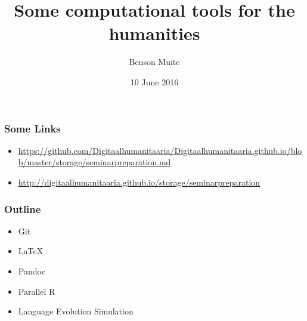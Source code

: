 \documentclass{beamer}
\title[]
{Some computational tools for the humanities}
\author[]{Benson Muite}
\institute[]{\url{benson.muite@ut.ee}\\
                  \url{http://kodu.ut.ee/~benson/}                  }
\date[]{10 June 2016}
\begin{document}
\begin{frame}
  \titlepage
\end{frame}



\begin{frame}
\frametitle{Some Links}
\begin{itemize}
\item  \url{https://github.com/Digitaalhumanitaaria/Digitaalhumanitaaria.github.io/blob/master/storage/seminarpreparation.md}
\item  \url{http://digitaalhumanitaaria.github.io/storage/seminarpreparation}
\end{itemize}
\end{frame}


\begin{frame}
\frametitle{Outline}
\begin{itemize}
\item Git
\item LaTeX
\item Pandoc
\item Parallel R
\item Language Evolution Simulation
\end{itemize}
\end{frame}
\end{document}
